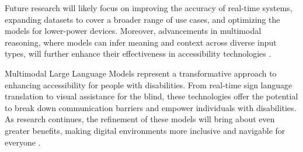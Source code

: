 \documentclass{article}
\begin{document}
Future research will likely focus on improving the accuracy of real-time systems, expanding datasets to cover a broader range of use cases, and optimizing the models for lower-power devices. Moreover, advancements in multimodal reasoning, where models can infer meaning and context across diverse input types, will further enhance their effectiveness in accessibility technologies \cite{vs2023chen}.


Multimodal Large Language Models represent a transformative approach to enhancing accessibility for people with disabilities. From real-time sign language translation to visual assistance for the blind, these technologies offer the potential to break down communication barriers and empower individuals with disabilities. As research continues, the refinement of these models will bring about even greater benefits, making digital environments more inclusive and navigable for everyone \cite{vs2024yang,vs2024song,vs2024li}.




\end{document}
